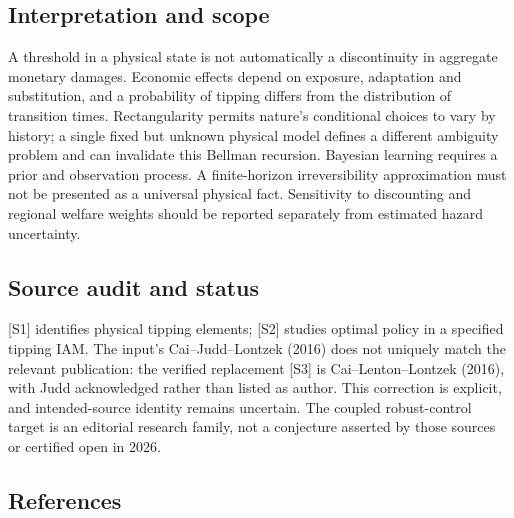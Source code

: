 \documentclass[11pt,a4paper]{article}
\begin{document}
\subsection*{Interpretation and scope}

A threshold in a physical state is not automatically a discontinuity in aggregate monetary damages. Economic effects depend on exposure, adaptation and substitution, and a probability of tipping differs from the distribution of transition times. Rectangularity permits nature's conditional choices to vary by history; a single fixed but unknown physical model defines a different ambiguity problem and can invalidate this Bellman recursion. Bayesian learning requires a prior and observation process. A finite-horizon irreversibility approximation must not be presented as a universal physical fact. Sensitivity to discounting and regional welfare weights should be reported separately from estimated hazard uncertainty.

\subsection*{Source audit and status}

[S1] identifies physical tipping elements; [S2] studies optimal policy in a specified tipping IAM. The input's Cai--Judd--Lontzek (2016) does not uniquely match the relevant publication: the verified replacement [S3] is Cai--Lenton--Lontzek (2016), with Judd acknowledged rather than listed as author. This correction is explicit, and intended-source identity remains uncertain. The coupled robust-control target is an editorial research family, not a conjecture asserted by those sources or certified open in 2026.

\subsection*{References}
\end{document}
